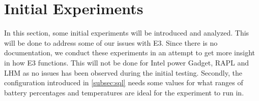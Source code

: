 \section{Initial Experiments}\label{sec:initial_experiments}




In this section, some initial experiments will be introduced and analyzed. This will be done to address some of our issues with E3. Since there is no documentation, we conduct these experiments in an attempt to get more insight in how E3 functions. This will not be done for Intel power Gadget, RAPL and LHM as no issues has been observed during the initial testing. Secondly, the configuration introduced in \cref{subsec:sql} needs some values for what ranges of battery percentages and temperatures are ideal for the experiment to run in.







% 


